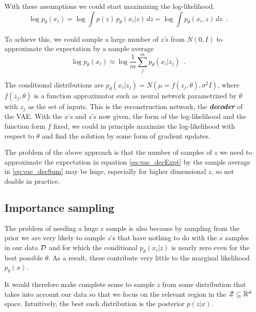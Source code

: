 With these assumptions we could start maximizing the log-likelihood.
\begin{equation}\label{eq:vae_decExpt}
\log p_{\theta}(x_i) = \log \int p(z) \, p_{\theta}(x_i|z) \, dz
= \log \int p_{\theta}(x_i, z) \, dz \enspace .
\end{equation}

To achieve this, we could sample a large number of $z$'s from $N(0, I)$ to approximate the expectation by a sample average
\begin{equation}\label{eq:vae_decSum}
\log p_{\theta}(x_i) \approx \log \frac{1}{m} \sum_j^m p_{\theta}(x_i|z_j) \enspace .
\end{equation}

The conditional distributions are $p_{\theta}(x_i|z_j) = N(\mu = f(z_j, \theta), \sigma^2 I)$, 
where $f(z_j, \theta)$ is a function approximator such as neural network parametrized by $\theta$ with $z_j$ as the set of inputs.
This is the reconstruction network, the \emph{\textbf{decoder}} of the VAE.
With the $x$'s and $z$'s now given, the form of the log-likelihood and the function form $f$ fixed, we could in principle maximize the log-likelihood with respect to $\theta$ and find the solution by some form of gradient updates.

The problem of the above approach is that the number of samples of $z$ we need to approximate the expectation in equation \eqref{eq:vae_decExpt} by the sample average in \eqref{eq:vae_decSum} may be huge, especially for higher dimensional $z$, so not doable in practice.

\subsection{Importance sampling}\label{sec:Vae_importanceSamplint}
The problem of needing a huge $z$ sample is also because by sampling from the prior we are very likely to sample $z$'s that have nothing to do with the $x$ samples in our data $\mathcal{D}$ and for which the conditional $p_{\theta}(x_i|z)$ is nearly zero even for the best possible $\theta$.
As a result, these contribute very little to the marginal likelihood $p_{\theta}(x)$.

It would therefore make complete sense to sample $z$ from some distribution that takes into account our data so that we focus on the relevant region in the $\mathcal{Z} \subseteq \mathbb{R}^d$ space.
Intuitively, the best such distribution is the posterior $p(z|x)$.

